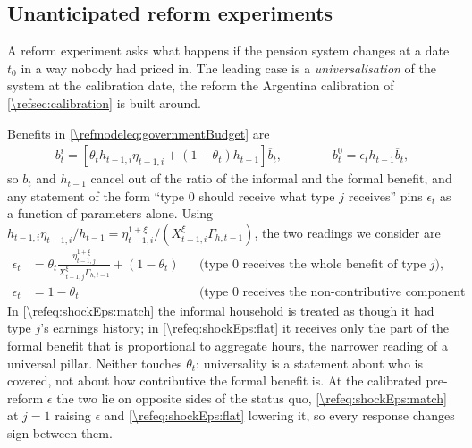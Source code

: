 \subsection{Unanticipated reform experiments}\label{\refsec:shock}
A reform experiment asks what happens if the pension system changes at a date $t_0$ in a way nobody had priced in. The leading case is a \emph{universalisation} of the system at the calibration date, the reform the Argentina calibration of \cref{\refsec:calibration} is built around.

Benefits in \eqref{\refmodeleq:governmentBudget} are
\begin{align*}
    b_t^i = \left[\theta_t h_{t-1,i}\eta_{t-1,i} + (1-\theta_t)h_{t-1}\right]\overline{b}_t,
    \qquad\qquad b_t^0 = \epsilon_t h_{t-1}\overline{b}_t,
\end{align*}
so $\overline{b}_t$ and $h_{t-1}$ cancel out of the ratio of the informal and the formal benefit, and any statement of the form ``type $0$ should receive what type $j$ receives'' pins $\epsilon_t$ as a function of parameters alone. Using $h_{t-1,i}\eta_{t-1,i}/h_{t-1} = \eta_{t-1,i}^{1+\xi}/(X_{t-1,i}^{\xi}\Gamma_{h,t-1})$, the two readings we consider are
\begin{subequations}\label{\refeq:shockEps}
    \begin{align}
        \epsilon_t &= \theta_t\frac{\eta_{t-1,j}^{1+\xi}}{X_{t-1,j}^{\xi}\Gamma_{h,t-1}} + (1-\theta_t)
        &&\text{(type $0$ receives the whole benefit of type $j$),} \label{\refeq:shockEps:match}\\
        \epsilon_t &= 1-\theta_t
        &&\text{(type $0$ receives the non-contributive component only).} \label{\refeq:shockEps:flat}
    \end{align}
\end{subequations}
In \eqref{\refeq:shockEps:match} the informal household is treated as though it had type $j$'s earnings history; in \eqref{\refeq:shockEps:flat} it receives only the part of the formal benefit that is proportional to aggregate hours, the narrower reading of a universal pillar. Neither touches $\theta_t$: universality is a statement about who is covered, not about how contributive the formal benefit is. At the calibrated pre-reform $\epsilon$ the two lie on opposite sides of the status quo, \eqref{\refeq:shockEps:match} at $j=1$ raising $\epsilon$ and \eqref{\refeq:shockEps:flat} lowering it, so every response changes sign between them.

